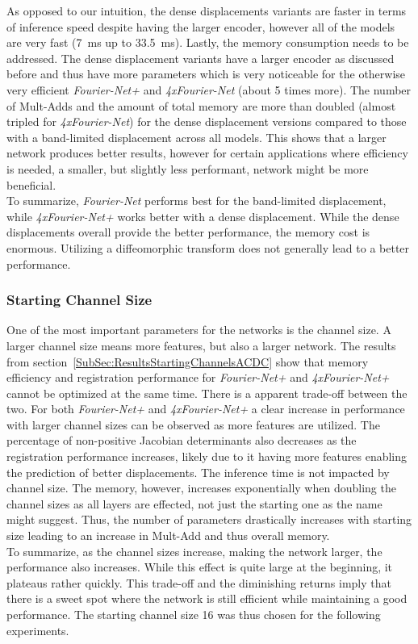 As opposed to our intuition, the dense displacements variants are faster in terms of inference speed despite having the larger encoder, however all of the models are very fast (7~ms up to 33.5~ms). Lastly, the memory consumption needs to be addressed. The dense displacement variants have a larger encoder as discussed before and thus have more parameters which is very noticeable for the otherwise very efficient \emph{Fourier-Net+} and \emph{4xFourier-Net} (about 5 times more). The number of Mult-Adds and the amount of total memory are more than doubled (almost tripled for \emph{4xFourier-Net}) for the dense displacement versions compared to those with a band-limited displacement across all models. This shows that a larger network produces better results, however for certain applications where efficiency is needed, a smaller, but slightly less performant, network might be more beneficial.\\
To summarize, \emph{Fourier-Net} performs best for the band-limited displacement, while \emph{4xFourier-Net+} works better with a dense displacement. While the dense displacements overall provide the better performance, the memory cost is enormous. Utilizing a diffeomorphic transform does not generally lead to a better performance.

\subsubsection{Starting Channel Size} \label{SubSubSec:DiscussionStartingChannelsACDC}
One of the most important parameters for the networks is the channel size. A larger channel size means more features, but also a larger network. The results from section~\ref{SubSec:ResultsStartingChannelsACDC} show that memory efficiency and registration performance for \emph{Fourier-Net+} and \emph{4xFourier-Net+} cannot be optimized at the same time. There is a apparent trade-off between the two. For both \emph{Fourier-Net+} and \emph{4xFourier-Net+} a clear increase in performance with larger channel sizes can be observed as more features are utilized. The percentage of non-positive Jacobian determinants also decreases as the registration performance increases, likely due to it having more features enabling the prediction of better displacements. The inference time is not impacted by channel size. The memory, however, increases exponentially when doubling the channel sizes as all layers are effected, not just the starting one as the name might suggest. Thus, the number of parameters drastically increases with starting size leading to an increase in Mult-Add and thus overall memory. \\
To summarize, as the channel sizes increase, making the network larger, the performance also increases. While this effect is quite large at the beginning, it plateaus rather quickly. This trade-off and the diminishing returns imply that there is a sweet spot where the network is still efficient while maintaining a good performance. The starting channel size 16 was thus chosen for the following experiments.


